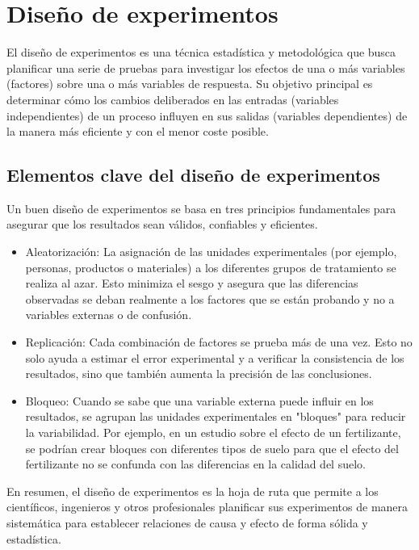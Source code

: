 \documentclass{article}
\begin{document}
\section*{Diseño de experimentos}

El diseño de experimentos es una técnica estadística y metodológica que
busca planificar una serie de pruebas para investigar los efectos de una o
más variables (factores) sobre una o más variables de respuesta. Su objetivo
principal es determinar cómo los cambios deliberados en las entradas
(variables independientes) de un proceso influyen en sus salidas (variables
dependientes) de la manera más eficiente y con el menor coste posible.

\subsection*{Elementos clave del diseño de experimentos}

Un buen diseño de experimentos se basa en tres principios fundamentales para
asegurar que los resultados sean válidos, confiables y eficientes.

\begin{itemize}
  \item Aleatorización: La asignación de las unidades experimentales (por
    ejemplo, personas, productos o materiales) a los diferentes grupos de
    tratamiento se realiza al azar. Esto minimiza el sesgo y asegura que las
    diferencias observadas se deban realmente a los factores que se están
    probando y no a variables externas o de confusión.
  \item Replicación: Cada combinación de factores se prueba más de una vez.
    Esto no solo ayuda a estimar el error experimental y a verificar la
    consistencia de los resultados, sino que también aumenta la precisión de
    las conclusiones.
  \item Bloqueo: Cuando se sabe que una variable externa puede influir en
    los resultados, se agrupan las unidades experimentales en "bloques" para
    reducir la variabilidad. Por ejemplo, en un estudio sobre el efecto de
    un fertilizante, se podrían crear bloques con diferentes tipos de suelo
    para que el efecto del fertilizante no se confunda con las diferencias
    en la calidad del suelo.
\end{itemize}

En resumen, el diseño de experimentos es la hoja de ruta que permite a los
científicos, ingenieros y otros profesionales planificar sus experimentos de
manera sistemática para establecer relaciones de causa y efecto de forma
sólida y estadística.
\end{document}
